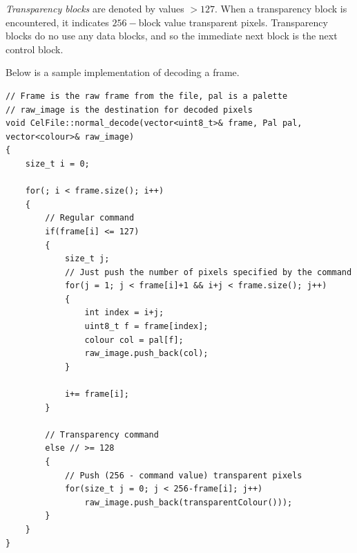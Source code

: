 \documentclass[a4paper]{article}
\begin{document}
	\emph{Transparency blocks} are denoted by values $> 127$. When a transparency block is encountered, it indicates $256-$block value transparent pixels. Transparency blocks do no use any data blocks, and so the immediate next block is the next control block.
	
	Below is a sample implementation of decoding a frame.
	
	\begin{lstlisting}
// Frame is the raw frame from the file, pal is a palette
// raw_image is the destination for decoded pixels
void CelFile::normal_decode(vector<uint8_t>& frame, Pal pal, vector<colour>& raw_image)
{
    size_t i = 0;
    
    for(; i < frame.size(); i++)
    {   
        // Regular command
        if(frame[i] <= 127)
        {    
            size_t j;
            // Just push the number of pixels specified by the command
            for(j = 1; j < frame[i]+1 && i+j < frame.size(); j++)
            {
                int index = i+j;
                uint8_t f = frame[index];
                colour col = pal[f];
                raw_image.push_back(col);
            }
    
            i+= frame[i];
        }

        // Transparency command
        else // >= 128
        {
            // Push (256 - command value) transparent pixels
            for(size_t j = 0; j < 256-frame[i]; j++)
                raw_image.push_back(transparentColour()));
        }
    }
}
	\end{lstlisting}
\end{document}
